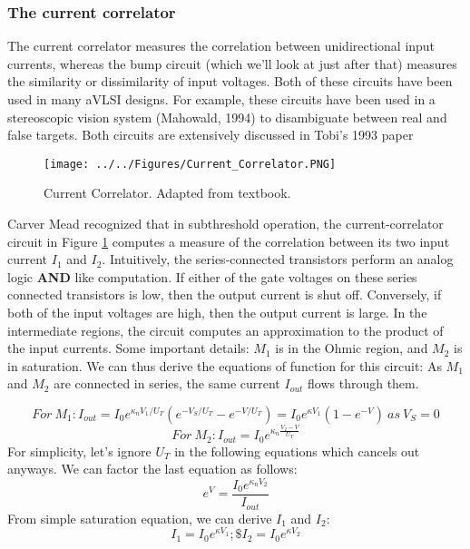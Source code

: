 \newpage
\subsubsection{The current correlator}
\label{section:currentcorrelator}

The current correlator measures the correlation between unidirectional input currents, whereas the bump circuit (which we'll look at just after that) measures the similarity or dissimilarity of input voltages. Both of these circuits have been used in many aVLSI designs. For example, these circuits have been used in a stereoscopic vision system
(Mahowald, 1994) to disambiguate between real and false targets. Both circuits are extensively discussed in Tobi's 1993 paper \cite{delbrueck1993bump}

\begin{figure}[H]
    \centering
    \texttt{[image: ../../Figures/Current\_Correlator.PNG]}
    \caption{Current Correlator. Adapted from textbook.}
    \label{fig:current_correlator}
\end{figure}

Carver Mead recognized that in subthreshold operation, the current-correlator circuit
in Figure \ref{fig:current_correlator} computes a measure of the correlation between its two input current $I_1$ and $I_2$. Intuitively, the series-connected transistors perform an analog logic \textbf{AND} like computation. If either of the gate voltages on these series connected transistors is low, then the output current is shut off. Conversely, if both of the input voltages are high, then the output current is large. In the intermediate regions, the circuit computes an approximation to the product of the input currents. Some important details: $M_1$ is in the Ohmic region, and $M_2$ is in saturation. We can thus derive the equations of function for this circuit: As $M_1$ and $M_2$ are connected in series, the same current $I_{out}$ flows through them. 

\begin{equation}
    For \ M_1: I_{out} = I_0e^{\kappa_n V_1/U_T}(e^{-V_S/U_T} - e^{-V/U_T}) = I_0e^{\kappa V_1}(1 - e^{-V}) \ as \ V_S = 0 
\end{equation}
\begin{equation}
    For \ M_2: I_{out} = I_0e^{\kappa_n \frac{V_2 - V}{U_T}} 
\end{equation}
For simplicity, let's ignore $U_T$ in the following equations which cancels out anyways. 
We can factor the last equation as follows: 
\begin{equation}
    e^V = \frac{I_0e^{\kappa_n V_2}}{I_{out}} 
\end{equation}
From simple saturation equation, we can derive $I_1$ and $I_2$:
\begin{equation}
    I_1 = I_0 e^{\kappa V_1}; \$I_2 = I_0 e^{\kappa V_2}
\end{equation}

